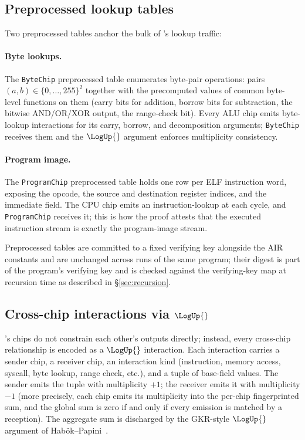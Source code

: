 \subsection{Preprocessed lookup tables}

Two preprocessed tables anchor the bulk of \Zirenver{}'s lookup traffic:

\paragraph{Byte lookups.} The \texttt{ByteChip} preprocessed table enumerates byte-pair operations: pairs $(a, b) \in \{0, \ldots, 255\}^2$ together with the precomputed values of common byte-level functions on them (carry bits for addition, borrow bits for subtraction, the bitwise AND/OR/XOR output, the range-check bit). Every ALU chip emits byte-lookup interactions for its carry, borrow, and decomposition arguments; \texttt{ByteChip} receives them and the $\LogUp{}$ argument enforces multiplicity consistency.

\paragraph{Program image.} The \texttt{ProgramChip} preprocessed table holds one row per ELF instruction word, exposing the opcode, the source and destination register indices, and the immediate field. The CPU chip emits an instruction-lookup at each cycle, and \texttt{ProgramChip} receives it; this is how the proof attests that the executed instruction stream is exactly the program-image stream.

Preprocessed tables are committed to a fixed verifying key alongside the AIR constants and are unchanged across runs of the same program; their digest is part of the program's verifying key and is checked against the verifying-key map at recursion time as described in \S\ref{sec:recursion}.

\subsection{Cross-chip interactions via $\LogUp{}$}
\label{sec:circuit-logup}

\Zirenver{}'s chips do not constrain each other's outputs directly; instead, every cross-chip relationship is encoded as a $\LogUp{}$ interaction. Each interaction carries a sender chip, a receiver chip, an interaction kind (instruction, memory access, syscall, byte lookup, range check, etc.), and a tuple of base-field values. The sender emits the tuple with multiplicity $+1$; the receiver emits it with multiplicity $-1$ (more precisely, each chip emits its multiplicity into the per-chip fingerprinted sum, and the global sum is zero if and only if every emission is matched by a reception). The aggregate sum is discharged by the GKR-style $\LogUp{}$ argument of Habök--Papini~\citep{logup-gkr,haboeck}.

